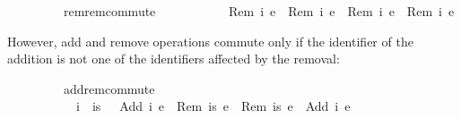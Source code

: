 \vspace{0.25em}
\begin{isabellebody}
\ \ \ \ \ \ \ \ \ rem{\isacharunderscore}rem{\isacharunderscore}commute{\isacharcolon}\isanewline
\ \ \ \ \ \ \ \ \ \ \ {\isachardoublequoteopen}{\isasymlangle}Rem\ i{}\ e{}{\isasymrangle}\ {\isasymrhd}\ {\isasymlangle}Rem\ i{}\ e{}{\isasymrangle}\ {\isacharequal}\ {\isasymlangle}Rem\ i{}\ e{}{\isasymrangle}\ {\isasymrhd}\ {\isasymlangle}Rem\ i{}\ e{}{\isasymrangle}{\isachardoublequoteclose}
\end{isabellebody}
\vspace{0.25em}
\noindent However, add and remove operations commute only if the identifier of the addition is not one of the identifiers affected by the removal:
\vspace{0.25em}
\begin{isabellebody}
\ \ \ \ \ \ \ \ \ add{\isacharunderscore}rem{\isacharunderscore}commute{\isacharcolon}\isanewline
\ \ \ \ \ \ \ \ \ \ \ {\isachardoublequoteopen}i\ {\isasymnotin}\ is{\isachardoublequoteclose}\ \ \ {\isachardoublequoteopen}{\isasymlangle}Add\ i\ e{}{\isasymrangle}\ {\isasymrhd}\ {\isasymlangle}Rem\ is\ e{}{\isasymrangle}\ {\isacharequal}\ {\isasymlangle}Rem\ is\ e{}{\isasymrangle}\ {\isasymrhd}\ {\isasymlangle}Add\ i\ e{}{\isasymrangle}{\isachardoublequoteclose}
\end{isabellebody}
\vspace{0.25em}


